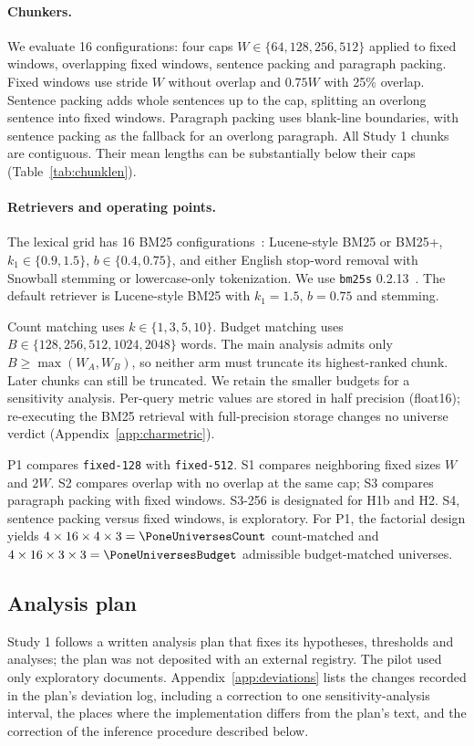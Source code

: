 \documentclass[11pt]{article}
\newcommand{\chunk}[1]{\texttt{#1}}
\begin{document}
\paragraph{Chunkers.}
We evaluate 16 configurations: four caps $W\in\{64,128,256,512\}$ applied to fixed windows, overlapping fixed windows, sentence packing and paragraph packing. Fixed windows use stride $W$ without overlap and $0.75W$ with 25\% overlap. Sentence packing adds whole sentences up to the cap, splitting an overlong sentence into fixed windows. Paragraph packing uses blank-line boundaries, with sentence packing as the fallback for an overlong paragraph. All Study 1 chunks are contiguous. Their mean lengths can be substantially below their caps (Table~\ref{tab:chunklen}).

\paragraph{Retrievers and operating points.}
The lexical grid has 16 BM25 configurations~\cite{robertson2009bm25}: Lucene-style BM25 or BM25+, $k_1\in\{0.9,1.5\}$, $b\in\{0.4,0.75\}$, and either English stop-word removal with Snowball stemming or lowercase-only tokenization. We use \texttt{bm25s} 0.2.13~\cite{lu2024bm25s}. The default retriever is Lucene-style BM25 with $k_1=1.5$, $b=0.75$ and stemming.

Count matching uses $k\in\{1,3,5,10\}$. Budget matching uses $B\in\{128,256,512,1024,2048\}$ words. The main analysis admits only $B\geq\max(W_A,W_B)$, so neither arm must truncate its highest-ranked chunk. Later chunks can still be truncated. We retain the smaller budgets for a sensitivity analysis. Per-query metric values are stored in half precision (float16); re-executing the BM25 retrieval with full-precision storage changes no universe verdict (Appendix~\ref{app:charmetric}).

P1 compares \chunk{fixed-128} with \chunk{fixed-512}. S1 compares neighboring fixed sizes $W$ and $2W$. S2 compares overlap with no overlap at the same cap; S3 compares paragraph packing with fixed windows. S3-256 is designated for H1b and H2. S4, sentence packing versus fixed windows, is exploratory. For P1, the factorial design yields $4\times16\times4\times3=\PoneUniversesCount$ count-matched and $4\times16\times3\times3=\PoneUniversesBudget$ admissible budget-matched universes.

\subsection{Analysis plan}
Study 1 follows a written analysis plan that fixes its hypotheses, thresholds and analyses; the plan was not deposited with an external registry. The pilot used only exploratory documents. Appendix~\ref{app:deviations} lists the changes recorded in the plan's deviation log, including a correction to one sensitivity-analysis interval, the places where the implementation differs from the plan's text, and the correction of the inference procedure described below.
\end{document}
